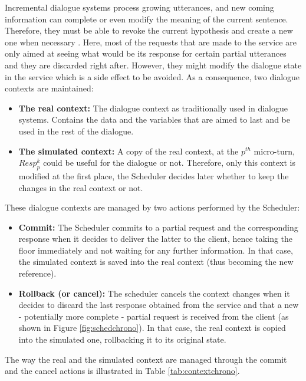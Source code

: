         Incremental dialogue systems process growing utterances, and new coming information can complete or even modify the meaning of the current sentence. Therefore, they must be able to revoke the current hypothesis and create a new one when necessary \cite{Schlangen2011}. Here, most of the requests that are made to the service are only aimed at seeing what would be its response for certain partial utterances and they are discarded right after. However, they might modify the dialogue state in the service which is a side effect to be avoided. As a consequence, two dialogue contexts are maintained:
        
        \begin{itemize}
           	\item \textbf{The real context:} The dialogue context as traditionally used in dialogue systems. Contains the data and the variables that are aimed to last and be used in the rest of the dialogue.
        	\item \textbf{The simulated context:} A copy of the real context, at the $p^{th}$ micro-turn, $Resp^k_p$ could be useful for the dialogue or not. Therefore, only this context is modified at the first place, the Scheduler decides later whether to keep the changes in the real context or not.
        \end{itemize}
        
        These dialogue contexts are managed by two actions performed by the Scheduler:
        
        \begin{itemize}
        	\item \textbf{Commit:} The Scheduler commits to a partial request and the corresponding response when it decides to deliver the latter to the client, hence taking the floor immediately and not waiting for any further information. In that case, the simulated context is saved into the real context (thus becoming the new reference).
            \item \textbf{Rollback (or cancel):} The scheduler cancels the context changes when it decides to discard the last response obtained from the service and that a new - potentially more complete - partial request is received from the client (as shown in Figure \ref{fig:schedchrono}). In that case, the real context is copied into the simulated one, rollbacking it to its original state.
        \end{itemize}
 
 		The way the real and the simulated context are managed through the commit and the cancel actions is illustrated in Table \ref{tab:contextchrono}.

